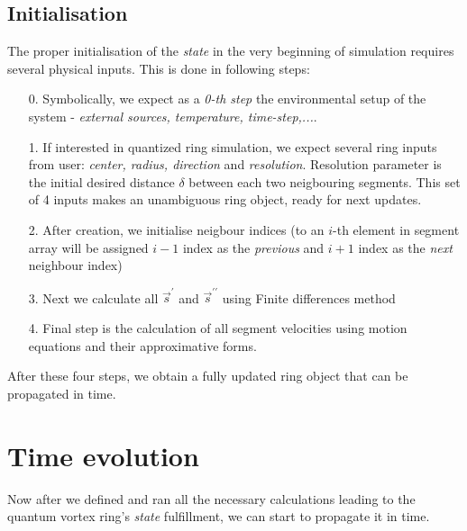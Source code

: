 \newpage

\subsection*{Initialisation}

The proper initialisation of the \textit{state} in the very beginning of simulation requires several physical inputs. This is done in following steps:
\begin{itemize}
	\item[0.] Symbolically, we expect as a \textit{0-th step} the environmental setup of the system - \textit{external sources, temperature, time-step,...}.

	\item[1.] If interested in quantized ring simulation, we expect several ring inputs from user: \textit{center, radius, direction} and \textit{resolution}.
	Resolution parameter is the initial desired distance $\delta$ between each two neigbouring segments. This set of 4 inputs makes an unambiguous ring object, ready for next updates.

	\item[2.] After creation, we initialise neigbour indices (to an $i$-th element in segment array will be assigned $i-1$ index as the \textit{previous} and $i+1$ index as the \textit{next} neighbour index)
	\item[3.] Next we calculate all $\vec{s}^{\prime}$ and $\vec{s}^{\prime\prime}$ using Finite differences method
	\item[4.] Final step is the calculation of all segment velocities using motion equations and their approximative forms.
\end{itemize}

After these four steps, we obtain a fully updated ring object that can be propagated in time.

\section{Time evolution}

Now after we defined and ran all the necessary calculations leading to the quantum vortex ring's \textit{state} fulfillment, we can start to propagate it in time.

